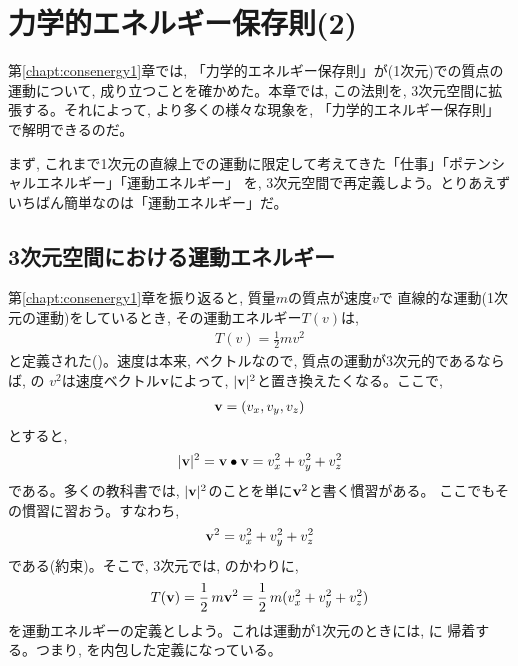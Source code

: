 \chapter{力学的エネルギー保存則(2)}

第\ref{chapt:consenergy1}章では, 「力学的エネルギー保存則」が(1次元)での質点の運動について, 
成り立つことを確かめた。本章では, この法則を, 3次元空間に拡張する。それによって, より多くの様々な現象を, 
「力学的エネルギー保存則」で解明できるのだ。\mv

まず, これまで1次元の直線上での運動に限定して考えてきた「仕事」「ポテンシャルエネルギー」「運動エネルギー」
を, 3次元空間で再定義しよう。とりあえずいちばん簡単なのは「運動エネルギー」だ。\mv

\section{3次元空間における運動エネルギー}

第\ref{chapt:consenergy1}章を振り返ると, 質量$m$の質点が速度$v$で
直線的な運動(1次元の運動)をしているとき, その運動エネルギー$T(v)$は, 
\begin{eqnarray}
T(v)=\frac{1}{2}mv^2\label{eq:kineticEnergy_again}
\end{eqnarray}
と定義された()。速度は本来, ベクトルなので, 
質点の運動が3次元的であるならば, の
$v^2$は速度ベクトル${\bf v}$によって, 
$|{\bf v}|^2$と置き換えたくなる。ここで, 
\begin{eqnarray} 
{\bf v}=(v_x, v_y, v_z)
\end{eqnarray} 
とすると, 
\begin{eqnarray} 
|{\bf v}|^2={\bf v}\bullet{\bf v}=v_x^2+v_y^2+v_z^2
\end{eqnarray} 
である。多くの教科書では, $|{\bf v}|^2$のことを単に${\bf v}^2$と書く慣習がある。
ここでもその慣習に習おう。すなわち, 
\begin{eqnarray} 
{\bf v}^2=v_x^2+v_y^2+v_z^2
\end{eqnarray} 
である(約束)。そこで, 3次元では, のかわりに, 
\begin{eqnarray} 
T({\bf v})=\frac{1}{2}\,m{\bf v}^2=\frac{1}{2}\,m(v_x^2+v_y^2+v_z^2)\label{eq:kineticEnergy3D0}
\end{eqnarray}
を運動エネルギーの定義としよう。これは運動が1次元のときには, に
帰着する。つまり, を内包した定義になっている。\mv



